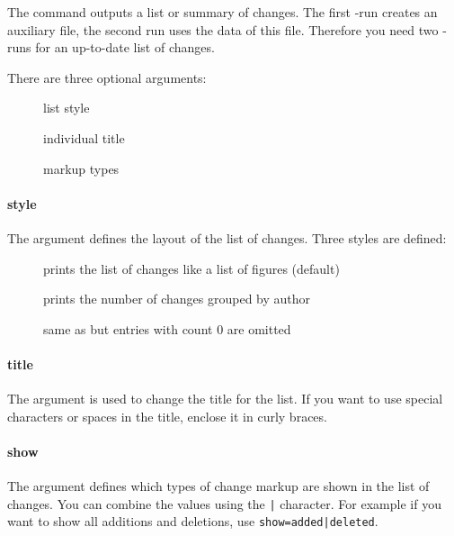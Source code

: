 

The command  outputs a list or summary of changes.
The first -run creates an auxiliary file, the second run uses the data of this file.
Therefore you need two -runs for an up-to-date list of changes.

There are three optional arguments:

\begin{description}
	\item[] list style
	\item[] individual title
	\item[] markup types
\end{description}

\paragraph{style}
The  argument defines the layout of the list of changes.
Three styles are defined:

\begin{description}
	\item[] prints the list of changes like a list of figures (default)
	\item[] prints the number of changes grouped by author
	\item[] same as  but entries with count 0 are omitted
\end{description}

\paragraph{title}
The  argument is used to change the title for the list.
If you want to use special characters or spaces in the title, enclose it in curly braces.

\paragraph{show}
The  argument defines which types of change markup are shown in the list of changes.
You can combine the values using the \texttt{|} character.
For example if you want to show all additions and deletions, use \texttt{show=added|deleted}.

